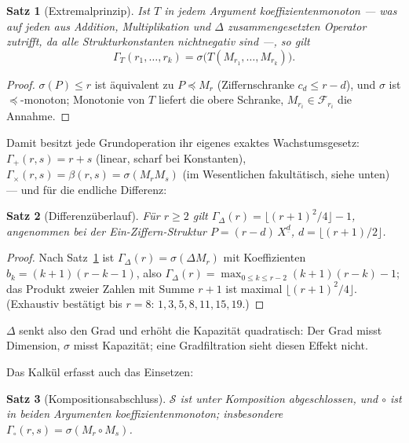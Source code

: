 \documentclass[11pt]{article}
\newtheorem{satz}{Satz}[section]
\theoremstyle{definition}
\theoremstyle{remark}
\newcommand{\Struk}{\mathcal S}
\newcommand{\ff}[2]{#1^{\underline{#2}}}
\begin{document}
\begin{satz}[Extremalprinzip]\label{satz:extremal}
Ist $T$ in jedem Argument koeffizientenmonoton --- was auf jeden aus
Addition, Multiplikation und $\Delta$ zusammengesetzten Operator
zutrifft, da alle Strukturkonstanten nichtnegativ sind ---, so gilt
\[
\Gamma_T(r_1,\ldots,r_k)=\sigma\bigl(T(M_{r_1},\ldots,M_{r_k})\bigr).
\]
\end{satz}

\begin{proof}
$\sigma(P)\le r$ ist äquivalent zu $P\preceq M_r$ (Ziffernschranke
$c_d\le r-d$), und $\sigma$ ist $\preceq$-monoton; Monotonie von $T$
liefert die obere Schranke, $M_{r_i}\in\mathcal F_{r_i}$ die
Annahme.
\end{proof}

Damit besitzt jede Grundoperation ihr eigenes exaktes
Wachstumsgesetz: $\Gamma_+(r,s)=r+s$ (linear, scharf bei
Konstanten), $\Gamma_\times(r,s)=\beta(r,s)=\sigma(M_rM_s)$ (im
Wesentlichen fakultätisch, siehe unten) --- und für die endliche
Differenz:

\begin{satz}[Differenzüberlauf]\label{satz:differenzueberlauf}
Für $r\ge2$ gilt
$\Gamma_\Delta(r)=\lfloor(r+1)^2/4\rfloor-1$, angenommen bei der
Ein-Ziffern-Struktur $P=(r{-}d)\,\ff Xd$, $d=\lfloor(r+1)/2\rfloor$.
\end{satz}

\begin{proof}
Nach Satz~\ref{satz:extremal} ist
$\Gamma_\Delta(r)=\sigma(\Delta M_r)$ mit Koeffizienten
$b_k=(k{+}1)(r{-}k{-}1)$, also
$\Gamma_\Delta(r)=\max_{0\le k\le r-2}(k{+}1)(r{-}k)-1$; das Produkt
zweier Zahlen mit Summe $r{+}1$ ist maximal
$\lfloor(r{+}1)^2/4\rfloor$. (Exhaustiv bestätigt bis $r=8$:
$1,3,5,8,11,15,19$.)
\end{proof}

$\Delta$ senkt also den Grad und erhöht die Kapazität quadratisch:
Der Grad misst Dimension, $\sigma$ misst Kapazität; eine
Gradfiltration sieht diesen Effekt nicht.

Das Kalkül erfasst auch das Einsetzen:

\begin{satz}[Kompositionsabschluss]\label{satz:komposition}
$\Struk$ ist unter Komposition abgeschlossen, und $\circ$ ist in
beiden Argumenten koeffizientenmonoton; insbesondere
$\Gamma_\circ(r,s)=\sigma(M_r\circ M_s)$.
\end{satz}
\end{document}
